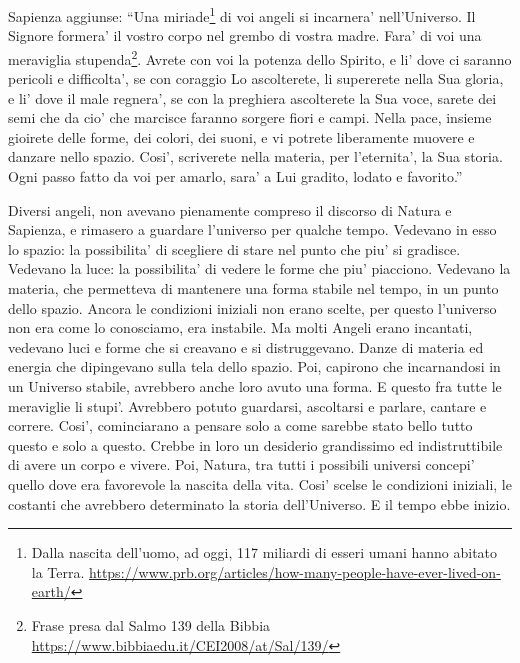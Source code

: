 {  Sapienza aggiunse:
\enquote{Una miriade\footnote{Dalla nascita dell'uomo, ad oggi, 117 miliardi di esseri umani hanno abitato la Terra. \url{https://www.prb.org/articles/how-many-people-have-ever-lived-on-earth/}} di voi angeli si incarnera' nell'Universo. 
Il Signore formera' il vostro corpo nel grembo di vostra madre. Fara' di voi una meraviglia stupenda\footnote{Frase presa dal Salmo 139 della Bibbia \url{https://www.bibbiaedu.it/CEI2008/at/Sal/139/}}.
Avrete con voi la potenza dello Spirito, e li' dove ci saranno pericoli e difficolta', se con coraggio Lo ascolterete, li supererete nella Sua gloria, e li' dove il male regnera', se con la preghiera ascolterete la Sua voce, sarete dei semi che da cio' che marcisce faranno sorgere fiori e campi. 
Nella pace, insieme gioirete delle forme, dei colori, dei suoni, e vi potrete liberamente muovere e danzare nello spazio.  
Cosi', scriverete nella materia, per l'eternita', la Sua storia. Ogni passo fatto da voi per amarlo, sara' a Lui gradito, lodato e favorito.}

Diversi angeli, non avevano pienamente compreso il discorso di Natura e Sapienza, e rimasero a guardare l'universo per qualche tempo. 
Vedevano in esso lo spazio: la possibilita' di scegliere di stare nel punto che piu' si gradisce. Vedevano la luce: la possibilita' di vedere le forme che piu' piacciono. Vedevano la materia, che permetteva di mantenere una forma stabile nel tempo, in un punto dello spazio.
  Ancora le condizioni iniziali non erano scelte, per questo l'universo non era come lo conosciamo, era instabile. Ma molti Angeli erano incantati, vedevano luci e forme che si creavano e si distruggevano. Danze di materia ed energia che dipingevano sulla tela dello spazio. Poi, capirono che incarnandosi in un Universo stabile, avrebbero anche loro avuto una forma. E questo fra tutte le meraviglie li stupi'. Avrebbero potuto guardarsi, ascoltarsi e parlare, cantare e correre.
Cosi', cominciarano a pensare solo a come sarebbe stato bello tutto questo e solo a questo. Crebbe in loro un desiderio grandissimo ed indistruttibile di avere un corpo e vivere.
Poi, Natura, tra tutti i possibili universi concepi' quello dove era favorevole la nascita della vita. Cosi' scelse le condizioni iniziali, le costanti che avrebbero determinato la storia dell'Universo. E il tempo ebbe inizio.

}
